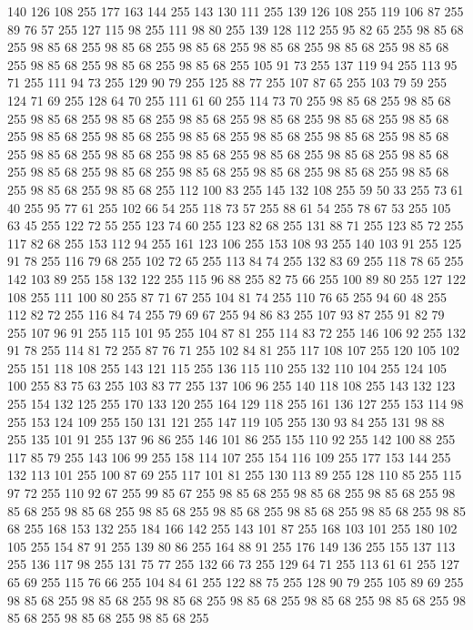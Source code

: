 140 126 108 255 177 163 144 255 143 130 111 255 139 126 108 255 119 106 87 255 89 76 57 255 127 115 98 255 111 98 80 255 139 128 112 255 95 82 65 255 98 85 68 255 98 85 68 255 98 85 68 255 98 85 68 255 98 85 68 255 98 85 68 255 98 85 68 255 98 85 68 255 98 85 68 255 98 85 68 255 105 91 73 255 137 119 94 255 113 95 71 255 111 94 73 255 129 90 79 255 125 88 77 255 107 87 65 255 103 79 59 255 124 71 69 255 128 64 70 255 111 61 60 255 114 73 70 255 98 85 68 255 98 85 68 255 98 85 68 255 98 85 68 255 98 85 68 255 98 85 68 255 98 85 68 255 98 85 68 255 98 85 68 255 98 85 68 255 98 85 68 255 98 85 68 255 98 85 68 255 98 85 68 255 98 85 68 255 98 85 68 255 98 85 68 255 98 85 68 255 98 85 68 255 98 85 68 255 98 85 68 255 98 85 68 255 98 85 68 255 98 85 68 255 98 85 68 255 98 85 68 255 98 85 68 255 98 85 68 255 112 100 83 255 145 132 108 255 59 50 33 255 73 61 40 255
95 77 61 255 102 66 54 255 118 73 57 255 88 61 54 255 78 67 53 255 105 63 45 255 122 72 55 255 123 74 60 255 123 82 68 255 131 88 71 255 123 85 72 255 117 82 68 255 153 112 94 255 161 123 106 255 153 108 93 255 140 103 91 255 125 91 78 255 116 79 68 255 102 72 65 255 113 84 74 255 132 83 69 255 118 78 65 255 142 103 89 255 158 132 122 255 115 96 88 255 82 75 66 255 100 89 80 255 127 122 108 255 111 100 80 255 87 71 67 255 104 81 74 255 110 76 65 255 94 60 48 255 112 82 72 255 116 84 74 255 79 69 67 255 94 86 83 255 107 93 87 255 91 82 79 255 107 96 91 255 115 101 95 255 104 87 81 255 114 83 72 255 146 106 92 255 132 91 78 255 114 81 72 255 87 76 71 255 102 84 81 255 117 108 107 255 120 105 102 255 151 118 108 255 143 121 115 255 136 115 110 255 132 110 104 255 124 105 100 255 83 75 63 255 103 83 77 255 137 106 96 255 140 118 108 255 143 132 123 255 154 132 125 255 170 133 120 255 164 129 118 255 161 136 127 255
153 114 98 255 153 124 109 255 150 131 121 255 147 119 105 255 130 93 84 255 131 98 88 255 135 101 91 255 137 96 86 255 146 101 86 255 155 110 92 255 142 100 88 255 117 85 79 255 143 106 99 255 158 114 107 255 154 116 109 255 177 153 144 255 132 113 101 255 100 87 69 255 117 101 81 255 130 113 89 255 128 110 85 255 115 97 72 255 110 92 67 255 99 85 67 255 98 85 68 255 98 85 68 255 98 85 68 255 98 85 68 255 98 85 68 255 98 85 68 255 98 85 68 255 98 85 68 255 98 85 68 255 98 85 68 255 168 153 132 255 184 166 142 255 143 101 87 255 168 103 101 255 180 102 105 255 154 87 91 255 139 80 86 255 164 88 91 255 176 149 136 255 155 137 113 255 136 117 98 255 131 75 77 255 132 66 73 255 129 64 71 255 113 61 61 255 127 65 69 255 115 76 66 255 104 84 61 255 122 88 75 255 128 90 79 255 105 89 69 255 98 85 68 255 98 85 68 255 98 85 68 255 98 85 68 255 98 85 68 255 98 85 68 255 98 85 68 255 98 85 68 255 98 85 68 255

